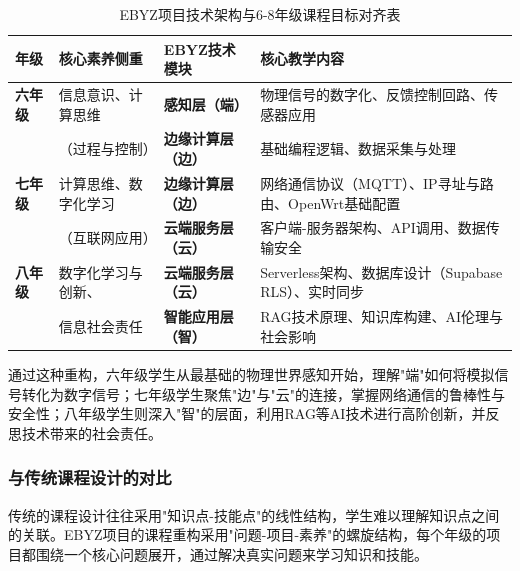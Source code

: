 \documentclass[12pt,a4paper,fontset=fandol]{ctexart}
\begin{document}
\begin{table}[H]
    \centering
    \caption{EBYZ项目技术架构与6-8年级课程目标对齐表}
    \label{tab:curriculum-alignment}
    \begin{tabular}{llll}
        \toprule
        \textbf{年级} & \textbf{核心素养侧重} & \textbf{EBYZ技术模块} & \textbf{核心教学内容} \\
        \midrule
        \textbf{六年级} & 信息意识、计算思维 & \textbf{感知层（端）} & 物理信号的数字化、反馈控制回路、传感器应用 \\
        & （过程与控制） & \textbf{边缘计算层（边）} & 基础编程逻辑、数据采集与处理 \\
        \midrule
        \textbf{七年级} & 计算思维、数字化学习 & \textbf{边缘计算层（边）} & 网络通信协议（MQTT）、IP寻址与路由、OpenWrt基础配置 \\
        & （互联网应用） & \textbf{云端服务层（云）} & 客户端-服务器架构、API调用、数据传输安全 \\
        \midrule
        \textbf{八年级} & 数字化学习与创新、 & \textbf{云端服务层（云）} & Serverless架构、数据库设计（Supabase RLS）、实时同步 \\
        & 信息社会责任 & \textbf{智能应用层（智）} & RAG技术原理、知识库构建、AI伦理与社会影响 \\
        \bottomrule
    \end{tabular}
\end{table}

通过这种重构，六年级学生从最基础的物理世界感知开始，理解"端"如何将模拟信号转化为数字信号；七年级学生聚焦"边"与"云"的连接，掌握网络通信的鲁棒性与安全性；八年级学生则深入"智"的层面，利用RAG等AI技术进行高阶创新，并反思技术带来的社会责任。

\subsubsection{与传统课程设计的对比}
传统的课程设计往往采用"知识点-技能点"的线性结构，学生难以理解知识点之间的关联。EBYZ项目的课程重构采用"问题-项目-素养"的螺旋结构，每个年级的项目都围绕一个核心问题展开，通过解决真实问题来学习知识和技能。
\end{document}
